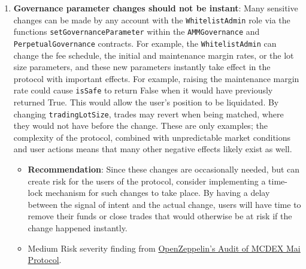 \begin{enumerate}
\item\textbf{Governance parameter changes should not be instant}: Many sensitive changes can be made by any account with the \verb|WhitelistAdmin| role via the functions \verb|setGovernanceParameter| within the \verb|AMMGovernance| and \verb|PerpetualGovernance| contracts. For example, the \verb|WhitelistAdmin| can change the fee schedule, the initial and maintenance margin rates, or the lot size parameters, and these new parameters instantly take effect in the protocol with important effects. For example, raising the maintenance margin rate could cause \verb|isSafe| to return False when it would have previously returned True. This would allow the user’s position to be liquidated. By changing \verb|tradingLotSize|, trades may revert when being matched, where they would not have before the change. These are only examples; the complexity of the protocol, combined with unpredictable market conditions and user actions means that many other negative effects likely exist as well.
	\begin{itemize}
	\item\textbf{Recommendation}: Since these changes are occasionally needed, but can create risk for the users of the protocol, consider implementing a time-lock mechanism for such changes to take place. By having a delay between the signal of intent and the actual change, users will have time to remove their funds or close trades that would otherwise be at risk if the change happened instantly.
	\item Medium Risk severity finding from \href{https://blog.openzeppelin.com/mcdex-mai-protocol-audit/}{OpenZeppelin’s Audit of MCDEX Mai Protocol}.
	\end{itemize}


\end{enumerate}

